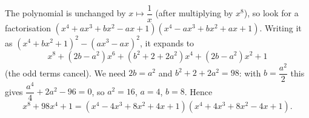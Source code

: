 The polynomial is unchanged by $x\mapsto\dfrac{1}{x}$ (after multiplying by $x^8$), so look for a factorisation $\left(x^4+ax^3+bx^2-ax+1\right)\left(x^4-ax^3+bx^2+ax+1\right)$. Writing it as $\left(x^4+bx^2+1\right)^2-\left(ax^3-ax\right)^2$, it expands to
\[x^8+\left(2b-a^2\right)x^6+\left(b^2+2+2a^2\right)x^4+\left(2b-a^2\right)x^2+1\]
(the odd terms cancel). We need $2b=a^2$ and $b^2+2+2a^2=98$: with $b=\dfrac{a^2}{2}$ this gives $\dfrac{a^4}{4}+2a^2-96=0$, so $a^2=16$, $a=4$, $b=8$. Hence
\[x^8+98x^4+1=\boxed{\left(x^4-4x^3+8x^2+4x+1\right)\left(x^4+4x^3+8x^2-4x+1\right)}.\]
